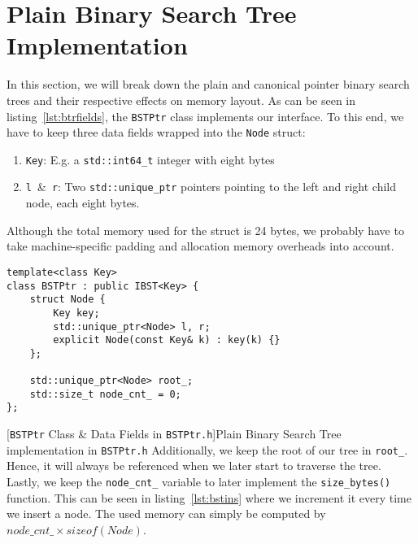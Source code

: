 \documentclass{article}
\begin{document}
\section{Plain Binary Search Tree Implementation}
\label{sec:plain}
In this section, we will break down the plain and canonical pointer binary search trees and their respective effects on memory layout. As can be seen in listing~\ref{lst:btrfields}, the \texttt{BSTPtr} class implements our interface. To this end, we have to keep three data fields wrapped into the \texttt{Node} struct: 
\begin{enumerate}
    \item \texttt{Key}: E.g. a \texttt{std::int64\_t} integer with eight bytes
    \item \texttt{l}~\&~\texttt{r}: Two \texttt{std::unique\_ptr} pointers pointing to the left and right child node, each eight bytes. 
\end{enumerate}
Although the total memory used for the struct is 24 bytes, we probably have to take machine-specific padding and allocation memory overheads into account. 
\begin{lstlisting}
template<class Key>
class BSTPtr : public IBST<Key> {
    struct Node {
        Key key;
        std::unique_ptr<Node> l, r;
        explicit Node(const Key& k) : key(k) {}
    };

    std::unique_ptr<Node> root_;
    std::size_t node_cnt_ = 0;
};
\end{lstlisting}
[\texttt{BSTPtr} Class \& Data Fields in \texttt{BSTPtr.h}]{Plain Binary Search Tree implementation in \texttt{BSTPtr.h}}
\label{lst:btrfields}
Additionally, we keep the root of our tree in \texttt{root\_}. Hence, it will always be referenced when we later start to traverse the tree. Lastly, we keep the \texttt{node\_cnt\_} variable to later implement the \texttt{size\_bytes()} function. This can be seen in listing~\ref{lst:bstins} where we increment it every time we insert a node. The used memory can simply be computed by $node\_cnt\_ \times sizeof(Node)$.
\end{document}
